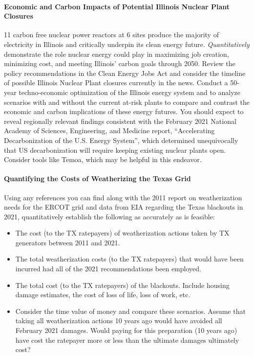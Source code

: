 \documentclass[12pts, answers]{exam}
\begin{document}
\paragraph{Economic and Carbon Impacts of Potential Illinois Nuclear Plant Closures} 
11 carbon free nuclear power reactors at 6 sites produce the majority of electricity in Illinois
and critically underpin its clean energy future. \emph{Quantitatively} demonstrate the
role nuclear energy could play in maximizing job creation, minimizing cost, and meeting Illinois’
carbon goals through 2050. Review the policy recommendations in the Clean 
Energy Jobs Act and consider the timeline of possible Illinois Nuclear Plant 
closures currently in the news. Conduct a 50-year techno-economic optimization of
the Illinois energy system and to analyze scenarios with and without the 
current at-risk plants to
compare and contrast the economic and carbon implications of these energy 
futures. You should expect to reveal regionally relevant findings consistent with the February 2021 National
Academy of Sciences, Engineering, and Medicine report, ``Accelerating Decarbonization of the
U.S. Energy System'', which determined unequivocally that US decarbonization will require
keeping existing nuclear plants open. Consider tools like Temoa, which may be 
helpful in this endeavor.

\paragraph{Quantifying the Costs of Weatherizing the Texas Grid}
Using any references you can find along with the 2011 report on weatherization needs for the ERCOT grid and data from 
EIA regarding the Texas blackouts in 2021, quantitatively establish the 
following as accurately as is feasible: 
\begin{itemize}
        \item The cost (to the TX ratepayers) of weatherization actions taken by TX generators between 2011 
                and 2021.
        \item The total weatherization costs (to the TX ratepayers) that would have been incurred had all 
                of the 2021 recommendations been employed.
        \item The total cost (to the TX ratepayers) of the blackouts. Include 
                housing damage estimates, the cost of loss of life, loss of 
                work, etc. 
        \item Consider the time value of money and compare these scenarios. 
                Assume that taking all weatherization actions 10 years ago would have 
                avoided all  February 2021 damages. Would paying for this preparation (10 years ago) have 
                cost the ratepayer more or less than the ultimate damages 
                ultimately cost?
\end{itemize}
\end{document}

